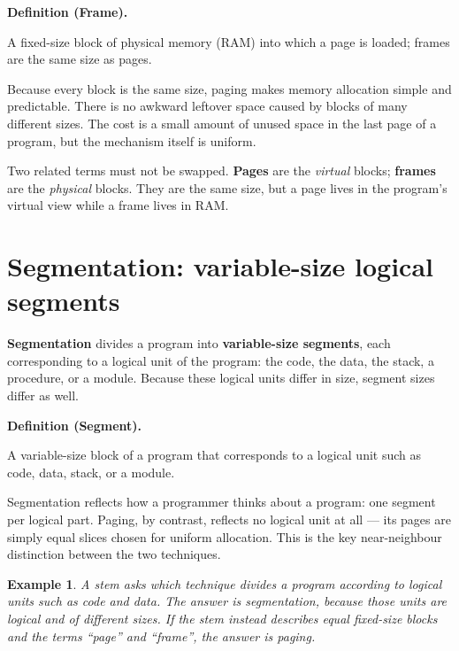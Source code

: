 \documentclass[11pt]{article}
\newtheorem{example}{Example}[section]
\newenvironment{definitionbox}[1]{%
  \par\noindent\textbf{Definition (#1).}\ \itshape
}{\par\vspace{0.3em}}
\begin{document}
\begin{definitionbox}{Frame}
A fixed-size block of physical memory (RAM) into which a page is loaded; frames
are the same size as pages.
\end{definitionbox}

Because every block is the same size, paging makes memory allocation simple and
predictable. There is no awkward leftover space caused by blocks of many
different sizes. The cost is a small amount of unused space in the last page of
a program, but the mechanism itself is uniform.

Two related terms must not be swapped. \textbf{Pages} are the \emph{virtual}
blocks; \textbf{frames} are the \emph{physical} blocks. They are the same size,
but a page lives in the program's virtual view while a frame lives in RAM.

\section{Segmentation: variable-size logical segments}
\textbf{Segmentation} divides a program into \textbf{variable-size segments},
each corresponding to a logical unit of the program: the code, the data, the
stack, a procedure, or a module. Because these logical units differ in size,
segment sizes differ as well.

\begin{definitionbox}{Segment}
A variable-size block of a program that corresponds to a logical unit such as
code, data, stack, or a module.
\end{definitionbox}

Segmentation reflects how a programmer thinks about a program: one segment per
logical part. Paging, by contrast, reflects no logical unit at all --- its pages
are simply equal slices chosen for uniform allocation. This is the key
near-neighbour distinction between the two techniques.

\begin{example}
A stem asks which technique divides a program according to logical units such as
code and data. The answer is segmentation, because those units are logical and
of different sizes. If the stem instead describes equal fixed-size blocks and
the terms ``page'' and ``frame'', the answer is paging.
\end{example}
\end{document}
